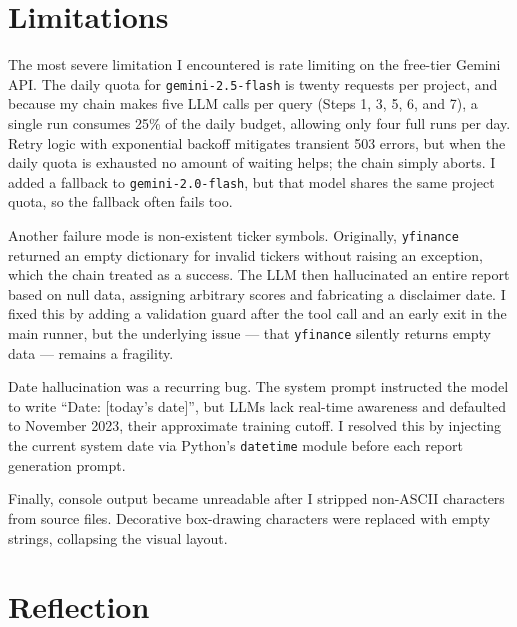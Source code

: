 \documentclass[11pt,a4paper]{article}
\begin{document}
\section{Limitations}

The most severe limitation I encountered is rate limiting on the free-tier Gemini API. The daily quota for \texttt{gemini-2.5-flash} is twenty requests per project, and because my chain makes five LLM calls per query (Steps 1, 3, 5, 6, and 7), a single run consumes 25\% of the daily budget, allowing only four full runs per day. Retry logic with exponential backoff mitigates transient 503 errors, but when the daily quota is exhausted no amount of waiting helps; the chain simply aborts. I added a fallback to \texttt{gemini-2.0-flash}, but that model shares the same project quota, so the fallback often fails too.

Another failure mode is non-existent ticker symbols. Originally, \texttt{yfinance} returned an empty dictionary for invalid tickers without raising an exception, which the chain treated as a success. The LLM then hallucinated an entire report based on null data, assigning arbitrary scores and fabricating a disclaimer date. I fixed this by adding a validation guard after the tool call and an early exit in the main runner, but the underlying issue --- that \texttt{yfinance} silently returns empty data --- remains a fragility.

Date hallucination was a recurring bug. The system prompt instructed the model to write ``Date: [today's date]'', but LLMs lack real-time awareness and defaulted to November 2023, their approximate training cutoff. I resolved this by injecting the current system date via Python's \texttt{datetime} module before each report generation prompt.

Finally, console output became unreadable after I stripped non-ASCII characters from source files. Decorative box-drawing characters were replaced with empty strings, collapsing the visual layout.

\section{Reflection}
\end{document}
